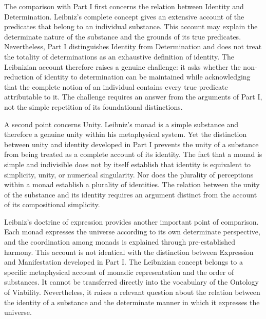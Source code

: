 \label{para:VS.B01.P01.C08.S07.SS10.P001}

The comparison with Part I first concerns the
relation between Identity and Determination.
Leibniz's complete concept gives an extensive
account of the predicates that belong to an
individual substance. This account may explain
the determinate nature of the substance and
the grounds of its true predicates. Nevertheless,
Part I distinguishes Identity from Determination
and does not treat the totality of determinations
as an exhaustive definition of identity.
The Leibnizian account therefore raises a
genuine challenge: it asks whether the
non-reduction of identity to determination
can be maintained while acknowledging that
the complete notion of an individual
contains every true predicate attributable
to it. The challenge requires an answer
from the arguments of Part I, not the
simple repetition of its foundational
distinctions.


\label{para:VS.B01.P01.C08.S07.SS10.P002}

A second point concerns Unity. Leibniz's
monad is a simple substance and therefore
a genuine unity within his metaphysical
system. Yet the distinction between unity
and identity developed in Part I prevents
the unity of a substance from being treated
as a complete account of its identity.
The fact that a monad is simple and
indivisible does not by itself establish
that identity is equivalent to simplicity,
unity, or numerical singularity. Nor
does the plurality of perceptions within
a monad establish a plurality of identities.
The relation between the unity of the
substance and its identity requires an
argument distinct from the account of
its compositional simplicity. 

\label{para:VS.B01.P01.C08.S07.SS10.P003}

Leibniz's doctrine of expression provides
another important point of comparison.
Each monad expresses the universe according
to its own determinate perspective, and
the coordination among monads is explained
through pre-established harmony. This
account is not identical with the distinction
between Expression and Manifestation
developed in Part I. The Leibnizian concept
belongs to a specific metaphysical account
of monadic representation and the order
of substances. It cannot be transferred
directly into the vocabulary of the
Ontology of Viability. Nevertheless,
it raises a relevant question about the
relation between the identity of a substance
and the determinate manner in which it
expresses the universe. 

